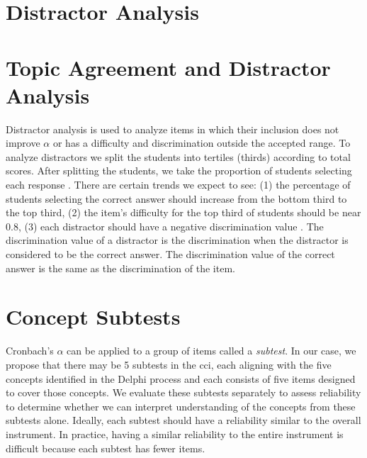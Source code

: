 \iflong
\section{Distractor Analysis}
\fi
\ifshort
\section{Topic Agreement and Distractor Analysis}
\fi


Distractor analysis is used to analyze items in which their inclusion does not improve $\alpha$ or has a difficulty and discrimination outside the accepted range. To analyze distractors we split the students into tertiles (thirds) according to total scores. After splitting the students, we take the proportion of students selecting each response \cite{og_ctt}. There are certain trends we expect to see: (1) the percentage of students selecting the correct answer should increase from the bottom third to the top third, (2) the item's difficulty for the top third of students should be near 0.8, (3) each distractor should have a negative discrimination value \cite{distractor}. The discrimination value of a distractor is the discrimination when the distractor is considered to be the correct answer. The discrimination value of the correct answer is the same as the discrimination of the item.
     
\section{Concept Subtests}     
     
Cronbach's $\alpha$ can be applied to a group of items called a \textit{subtest}. In our case, we propose that there may be 5 subtests in the \gls{cci}, each aligning with the five concepts identified in the Delphi process and each consists of five items designed to cover those concepts. We evaluate these subtests separately to assess reliability to determine whether we can interpret understanding of the concepts from these subtests alone. Ideally, each subtest should have a reliability similar to the overall instrument. In practice, having a similar reliability to the entire instrument is difficult because each subtest has fewer items.
